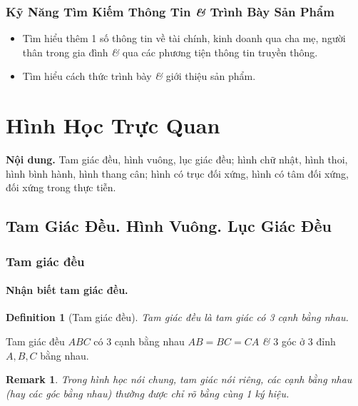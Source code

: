 \documentclass{article}
\numberwithin{equation}{section}
\newtheorem{definition}{Definition}[section]
\newtheorem{remark}{Remark}[section]
\begin{document}
\subsubsection{Kỹ Năng Tìm Kiếm Thông Tin \textit{\&} Trình Bày Sản Phẩm}

\begin{itemize}
	\item Tìm hiểu thêm 1 số thông tin về tài chính, kinh doanh qua cha mẹ, người thân trong gia đình \textit{\&} qua các phương tiện thông tin truyền thông.
	\item Tìm hiểu cách thức trình bày \textit{\&} giới thiệu sản phẩm.
\end{itemize}


\section{Hình Học Trực Quan}
\textbf{Nội dung.} Tam giác đều, hình vuông, lục giác đều; hình chữ nhật, hình thoi, hình bình hành, hình thang cân; hình có trục đối xứng, hình có tâm đối xứng, đối xứng trong thực tiễn.

\subsection{Tam Giác Đều. Hình Vuông. Lục Giác Đều}

\subsubsection{Tam giác đều}

\paragraph{Nhận biết tam giác đều.}
\begin{definition}[Tam giác đều]
	\emph{Tam giác đều} là tam giác có 3 cạnh bằng nhau.
\end{definition}
Tam giác đều $ABC$ có 3 cạnh bằng nhau $AB = BC = CA$ \textit{\&} 3 góc ở 3 đỉnh $A,B,C$ bằng nhau.

\begin{remark}
	Trong hình học nói chung, tam giác nói riêng, các cạnh bằng nhau (hay các góc bằng nhau) thường được chỉ rõ bằng cùng 1 ký hiệu.
\end{remark}
\end{document}
